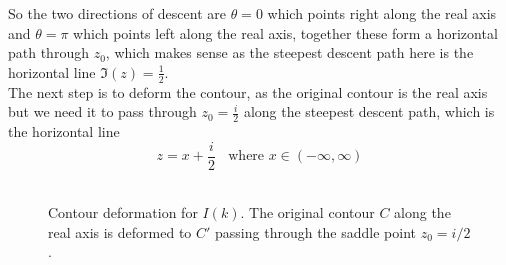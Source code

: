 So the two directions of descent are $\theta=0$ which points right along the real axis and $\theta=\pi$ which points left along the real axis, together these form a horizontal path through $z_0$, which makes sense as the steepest descent path here is the horizontal line $\Im(z)=\frac{1}{2}$. 
\\
The next step is to deform the contour, as the original contour is the real axis but we need it to pass through $z_0=\frac{i}{2}$ along the steepest descent path, which is the horizontal line 
\begin{equation}
    z=x+\frac{i}{2} \ \ \ \ \text{where } x\in(-\infty,\infty)
\end{equation}
\\

\begin{figure}[h]
\centering
{}
\caption{Contour deformation for $I(k)$. The original contour $C$ along 
the real axis is deformed to $C'$ passing through the saddle point $z_0 = i/2$.}
\label{fig:steepest_contour}
\end{figure}

